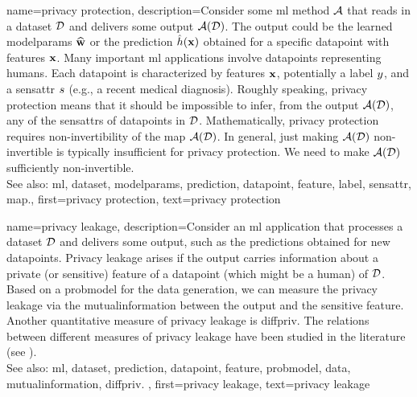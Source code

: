 {name={privacy protection},
     description={Consider some \gls{ml} method $\mathcal{A}$ that reads 
	 	in a \gls{dataset} $\mathcal{D}$ and delivers some output $\mathcal{A}(\mathcal{D})$. The output 
	 	could be the learned \gls{modelparams} $\widehat{{\bf w}}$ or the \gls{prediction} 
	 	$\hat{h}({\bf x})$ obtained for a specific \gls{datapoint} with \glspl{feature} 
	 	${\bf x}$. Many important \gls{ml} applications involve \glspl{datapoint} 
		representing humans. Each \gls{datapoint} is characterized by \glspl{feature} ${\bf x}$, 
		potentially a \gls{label} $y$, and a \gls{sensattr} $s$ (e.g., a recent medical diagnosis). 
		Roughly speaking, privacy protection means that it should be impossible to infer, from the output $\mathcal{A}(\mathcal{D})$, 
		any of the \glspl{sensattr} of \glspl{datapoint} in $\mathcal{D}$. Mathematically, privacy protection requires non-invertibility 
		of the \gls{map} $\mathcal{A}(\mathcal{D})$. In general, just making $\mathcal{A}(\mathcal{D})$ non-invertible 
		is typically insufficient for privacy protection. We need to make $\mathcal{A}(\mathcal{D})$ sufficiently non-invertible. 
					\\ 
		See also: \gls{ml}, \gls{dataset}, \gls{modelparams}, \gls{prediction}, \gls{datapoint}, \gls{feature}, \gls{label}, \gls{sensattr}, \gls{map}.}, 
	first={privacy protection}, 
	text={privacy protection} 
}

{name={privacy leakage},
	description={Consider an \gls{ml} application that processes a 
		\gls{dataset} $\mathcal{D}$ and delivers some output, such as the \glspl{prediction} 
		obtained for new \glspl{datapoint}. Privacy leakage arises 
		if the output carries information about a private (or sensitive) \gls{feature} of 
		a \gls{datapoint} (which might be a human) of $\mathcal{D}$. Based on a \gls{probmodel} 
		for the \gls{data} generation, we can measure the privacy leakage via the \gls{mutualinformation} 
		between the output and the sensitive \gls{feature}. Another quantitative measure of privacy leakage 
		is \gls{diffpriv}. The relations between different measures of privacy leakage have been 
		studied in the literature (see \cite{InfThDiffPriv}). 
				\\ 
		See also: \gls{ml}, \gls{dataset}, \gls{prediction}, \gls{datapoint}, \gls{feature}, \gls{probmodel}, \gls{data}, \gls{mutualinformation}, \gls{diffpriv}. }, 
	first={privacy leakage}, 
	text={privacy leakage} 
}


